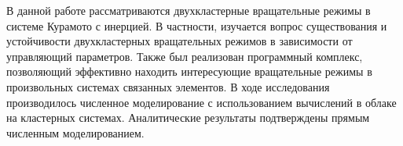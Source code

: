 В данной работе рассматриваются двухкластерные вращательные режимы в системе Курамото с инерцией. 
В частности, изучается вопрос существования и устойчивости двухкластерных вращательных режимов в зависимости от управляющий параметров.
Также был реализован программный комплекс, позволяющий эффективно находить интересующие вращательные
режимы в произвольных системах связанных элементов. 
В ходе исследования производилось численное моделирование с использованием вычислений в облаке на кластерных системах.
Аналитические результаты подтверждены прямым численным моделированием.
